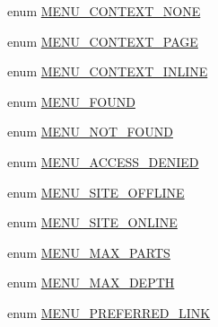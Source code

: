 \begin{DoxyCompactItemize}
\item 
enum \hyperlink{group__menu__context__types_ga19f4a6560ff590fbd049b4bcccf0a928}{MENU\_\-CONTEXT\_\-NONE} 
\item 
enum \hyperlink{group__menu__context__types_gaf4e86a5b19191e3dcad0257912df38cf}{MENU\_\-CONTEXT\_\-PAGE} 
\item 
enum \hyperlink{group__menu__context__types_gad814d6900713af2b410c9d347462b923}{MENU\_\-CONTEXT\_\-INLINE} 
\item 
enum \hyperlink{group__menu__status__codes_gabf2843e858b524578380ab90a4ce8048}{MENU\_\-FOUND} 
\item 
enum \hyperlink{group__menu__status__codes_ga67a38f79c8ab91fb6230daaaad6176f4}{MENU\_\-NOT\_\-FOUND} 
\item 
enum \hyperlink{group__menu__status__codes_ga87e8c6c6b42f3399cbe817d4d19cd892}{MENU\_\-ACCESS\_\-DENIED} 
\item 
enum \hyperlink{group__menu__status__codes_gad6222551ed027f4f367e11b11935cff9}{MENU\_\-SITE\_\-OFFLINE} 
\item 
enum \hyperlink{group__menu__status__codes_gaac31a368c93d567958be6f96e3f38425}{MENU\_\-SITE\_\-ONLINE} 
\item 
enum \hyperlink{group__menu__tree__parameters_ga57d50c60b259e886bac766d4ef33abb5}{MENU\_\-MAX\_\-PARTS} 
\item 
enum \hyperlink{group__menu__tree__parameters_gaae0d9e2610b50124cc0d2b120058c9b8}{MENU\_\-MAX\_\-DEPTH} 
\item 
enum \hyperlink{group__menu_ga4bc08b83d5906e9acd6f8102993af852}{MENU\_\-PREFERRED\_\-LINK} 
\end{DoxyCompactItemize}
